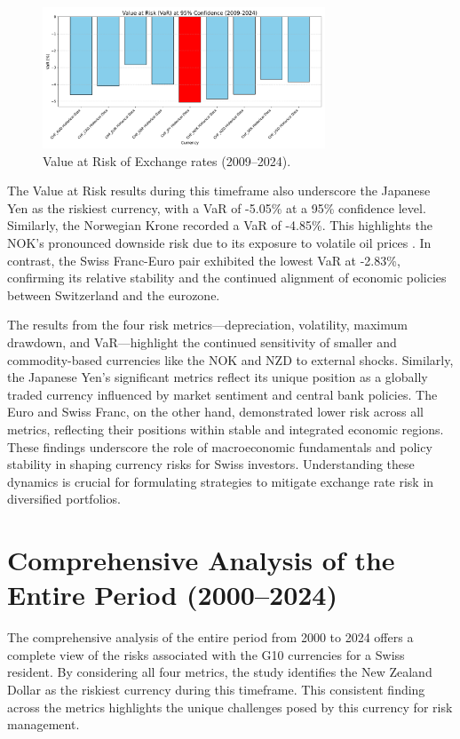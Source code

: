 \documentclass[11pt,a4paper,english,oneside]{book}
\begin{document}
\begin{figure}[h!]
    \centering
    \includegraphics[width=0.75\textwidth]{images/var_2009_2024.pdf}
    \caption{Value at Risk of Exchange rates (2009--2024).}
    \label{fig:var_2009_2024}
\end{figure}

The Value at Risk results during this timeframe also underscore the Japanese Yen as the riskiest currency, with a VaR of -5.05\% at a 95\% confidence level. Similarly, the Norwegian Krone recorded a VaR of -4.85\%. This highlights the NOK's pronounced downside risk due to its exposure to volatile oil prices \parencite{bergholt2016business}. In contrast, the Swiss Franc-Euro pair exhibited the lowest VaR at -2.83\%, confirming its relative stability and the continued alignment of economic policies between Switzerland and the eurozone.

The results from the four risk metrics—depreciation, volatility, maximum drawdown, and VaR—highlight the continued sensitivity of smaller and commodity-based currencies like the NOK and NZD to external shocks. Similarly, the Japanese Yen's significant metrics reflect its unique position as a globally traded currency influenced by market sentiment and central bank policies. The Euro and Swiss Franc, on the other hand, demonstrated lower risk across all metrics, reflecting their positions within stable and integrated economic regions. These findings underscore the role of macroeconomic fundamentals and policy stability in shaping currency risks for Swiss investors. Understanding these dynamics is crucial for formulating strategies to mitigate exchange rate risk in diversified portfolios.

\section{Comprehensive Analysis of the Entire Period (2000–2024)}
The comprehensive analysis of the entire period from 2000 to 2024 offers a complete view of the risks associated with the G10 currencies for a Swiss resident. By considering all four metrics, the study identifies the New Zealand Dollar as the riskiest currency during this timeframe. This consistent finding across the metrics highlights the unique challenges posed by this currency for risk management.
\end{document}

